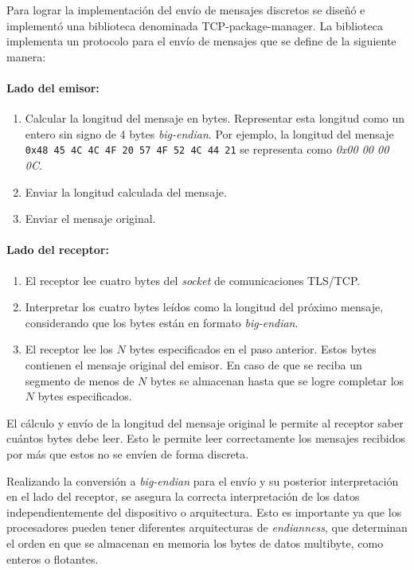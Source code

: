 Para lograr la implementación del envío de mensajes discretos se diseñó e implementó una biblioteca denominada TCP-package-manager. La biblioteca implementa un protocolo para el envío de mensajes que se define de la siguiente manera:

\paragraph{Lado del emisor:}
\begin{enumerate}
    \item Calcular la longitud del mensaje en bytes. Representar esta longitud como un entero sin signo de 4 bytes \textit{big-endian}. Por ejemplo, la longitud del mensaje \texttt{0x48 45 4C 4C 4F 20 57 4F 52 4C 44 21} se representa como \textit{0x00 00 00 0C}.
    \item Enviar la longitud calculada del mensaje.
    \item Enviar el mensaje original.
\end{enumerate}

\paragraph{Lado del receptor:}
\begin{enumerate}
    \item El receptor lee cuatro bytes del \textit{socket} de comunicaciones TLS/TCP.
    \item Interpretar los cuatro bytes leídos como la longitud del próximo mensaje, considerando que los bytes están en formato \textit{big-endian}.
    \item El receptor lee los $N$ bytes especificados en el paso anterior. Estos bytes contienen el mensaje original del emisor. En caso de que se reciba un segmento de menos de $N$ bytes se almacenan hasta que se logre completar los $N$ bytes especificados.
    
\end{enumerate}
El cálculo y envío de la longitud del mensaje original le permite al receptor saber cuántos bytes debe leer. Esto le permite leer correctamente los mensajes recibidos por más que estos no se envíen de forma discreta.

Realizando la conversión a \textit{big-endian} para el envío y su posterior interpretación en el lado del receptor, se asegura la correcta interpretación de los datos independientemente del dispositivo o arquitectura. Esto es importante ya que los procesadores pueden tener diferentes arquitecturas de \textit{endianness}, que determinan el orden en que se almacenan en memoria los bytes de datos multibyte, como enteros o flotantes.

